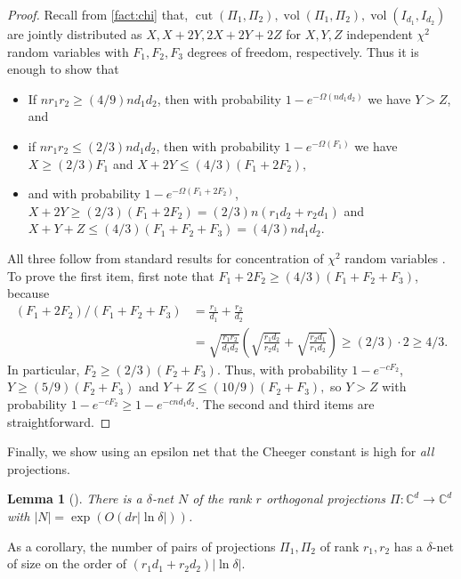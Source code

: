 \documentclass{article}
\newtheorem{lemma}[theorem]{Lemma}
\newcommand{\C}{{\mathbb{C}}}
\newcommand{\cut}{\operatorname{cut}}
\newcommand{\vol}{\operatorname{vol}}
\begin{document}
\begin{proof}
Recall from \cref{fact:chi} that, $\cut(\Pi_1, \Pi_2), \vol(\Pi_1, \Pi_2), \vol(I_{d_1}, I_{d_2})$ are jointly distributed as $X, X + 2Y, 2X + 2Y + 2Z$ for $X, Y, Z$ independent $\chi^2$ random variables with $F_1, F_2, F_3$ degrees of freedom, respectively. Thus it is enough to show that 
\begin{itemize}
\item If $nr_1 r_2 \geq (4/9) n d_1 d_2$, then with probability $1 - e^{- \Omega( n d_1 d_2)}$ we have $Y > Z$, and 
\item if $nr_1 r_2 \leq (2/3) n d_1 d_2$, then with probability $1 - e^{- \Omega(F_1)}$ we have $X \geq (2/3) F_1$ and $X + 2Y \leq (4/3) (F_1 + 2 F_2),$ 
\item and with probability $1 - e^{- \Omega(F_1 + 2 F_2)}$, $X + 2Y \geq (2/3) (F_1 + 2 F_2) = (2/3) n (r_1 d_2 + r_2 d_1)$ and $X + Y + Z \leq (4/3)(F_1 + F_2 + F_3) = (4/3)n d_1 d_2$. 
\end{itemize}
All three follow from standard results for concentration of $\chi^2$ random variables \cite{W19}. To prove the first item, first note that $F_1 + 2 F_2 \geq (4/3)(F_1 + F_2 + F_3)$, because 
\begin{align*}
(F_1 + 2 F_2)/( F_1 + F_2 + F_3) &= \frac{r_1}{d_1} + \frac{r_2}{d_2}\\
 &= \sqrt{ \frac{r_1 r_2}{d_1 d_2}}\left( \sqrt{ \frac{r_1 d_2}{r_2 d_1}} + \sqrt{ \frac{r_2 d_1}{r_1 d_2}}\right) \geq (2/3) \cdot 2 \geq 4/3.
\end{align*}
In particular, $F_2 \geq (2/3)(F_2 + F_3)$. Thus, with probability $1 - e^{- c F_2}$, $Y \geq (5/9) (F_2 + F_3)$ and $Y + Z \leq (10/9) (F _2 + F_3),$ so $Y > Z$ with probability $1 - e^{- c F_2} \geq 1 - e^{- c n d_1 d_2}$. The second and third items are straightforward. 
\end{proof}
Finally, we show using an epsilon net that the Cheeger constant is high for \emph{all} projections. 
\begin{lemma}[\cite{FM20}]\label{lem:net} There is a $\delta$-net $N$ of the rank $r$ orthogonal projections $\Pi: \C^d \to \C^d$ with $|N| = \exp(O(d r |\ln \delta|))$.
\end{lemma}
As a corollary, the number of pairs of projections $\Pi_1, \Pi_2$ of rank $r_1, r_2$ has a $\delta$-net of size on the order of $(r_1 d_1 + r_2 d_2) |\ln \delta|$. 
\end{document}
